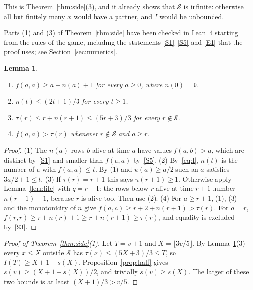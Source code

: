 \documentclass[11pt]{amsart}
\newtheorem{lemma}[theorem]{Lemma}
\theoremstyle{definition}
\theoremstyle{remark}
\newcommand{\Sc}{\mathcal{S}}
\begin{document}
This is Theorem~\ref{thm:side}(3), and it already shows that $\Sc$ is infinite: otherwise all
but finitely many $x$ would have a partner, and $I$ would be unbounded.

Parts (1) and (3) of Theorem~\ref{thm:side} have been checked in Lean~4 starting from the
rules of the game, including the statements \ref{S1}--\ref{S5} and \ref{E1} that the proof
uses; see Section~\ref{sec:numerics}.

\begin{lemma}\label{lem:deadline}
\begin{enumerate}
\item $f(a,a)\ge a+n(a)+1$ for every $a\ge0$, where $n(0)=0$.
\item $n(t)\le(2t+1)/3$ for every $t\ge1$.
\item $\tau(r)\le r+n(r+1)\le(5r+3)/3$ for every $r\notin\Sc$.
\item $f(a,a)>\tau(r)$ whenever $r\notin\Sc$ and $a\ge r$.
\end{enumerate}
\end{lemma}
\begin{proof}
(1) The $n(a)$ rows $b$ alive at time $a$ have values $f(a,b)>a$, which are distinct
by~\ref{S1} and smaller than $f(a,a)$ by~\ref{S5}.
(2) By~\eqref{eq:I}, $n(t)$ is the number of $a$ with $f(a,a)\le t$. By (1) and $n(a)\ge a/2$
such an $a$ satisfies $3a/2+1\le t$.
(3) If $\tau(r)=r+1$ this says $n(r+1)\ge1$. Otherwise apply Lemma~\ref{lem:life} with $q=r+1$:
the rows below $r$ alive at time $r+1$ number $n(r+1)-1$, because $r$ is alive too. Then use
(2).
(4) For $a\ge r+1$, (1), (3) and the monotonicity of $n$ give
$f(a,a)\ge r+2+n(r+1)>\tau(r)$. For $a=r$,
$f(r,r)\ge r+n(r)+1\ge r+n(r+1)\ge\tau(r)$, and equality is excluded by~\ref{S3}.
\end{proof}

\begin{proof}[Proof of Theorem~\ref{thm:side}(1)]
Let $T=v+1$ and $X=\lfloor 3v/5\rfloor$. By Lemma~\ref{lem:deadline}(3) every $x\le X$ outside
$\Sc$ has $\tau(x)\le(5X+3)/3\le T$, so $I(T)\ge X+1-s(X)$. Proposition~\ref{prop:half} gives
$s(v)\ge(X+1-s(X))/2$, and trivially $s(v)\ge s(X)$. The larger of these two bounds is at least
$(X+1)/3>v/5$.
\end{proof}
\end{document}
